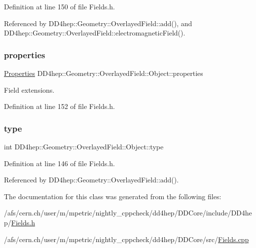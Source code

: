 Definition at line 150 of file Fields.\+h.



Referenced by D\+D4hep\+::\+Geometry\+::\+Overlayed\+Field\+::add(), and D\+D4hep\+::\+Geometry\+::\+Overlayed\+Field\+::electromagnetic\+Field().

\hypertarget{class_d_d4hep_1_1_geometry_1_1_overlayed_field_1_1_object_a184fdde08ca58abba25c3fbe812e21bc}{}\label{class_d_d4hep_1_1_geometry_1_1_overlayed_field_1_1_object_a184fdde08ca58abba25c3fbe812e21bc} 
\subsubsection{\texorpdfstring{properties}{properties}}
{\footnotesize\ttfamily \hyperlink{class_d_d4hep_1_1_geometry_1_1_overlayed_field_acdf81fbf8e0c336cb724ee2846a2c5b0}{Properties} D\+D4hep\+::\+Geometry\+::\+Overlayed\+Field\+::\+Object\+::properties}



Field extensions. 



Definition at line 152 of file Fields.\+h.

\hypertarget{class_d_d4hep_1_1_geometry_1_1_overlayed_field_1_1_object_a9cf611593f516274f139d0524d8480de}{}\label{class_d_d4hep_1_1_geometry_1_1_overlayed_field_1_1_object_a9cf611593f516274f139d0524d8480de} 
\subsubsection{\texorpdfstring{type}{type}}
{\footnotesize\ttfamily int D\+D4hep\+::\+Geometry\+::\+Overlayed\+Field\+::\+Object\+::type}



Definition at line 146 of file Fields.\+h.



Referenced by D\+D4hep\+::\+Geometry\+::\+Overlayed\+Field\+::add().



The documentation for this class was generated from the following files\+:\begin{DoxyCompactItemize}
\item 
/afs/cern.\+ch/user/m/mpetric/nightly\+\_\+cppcheck/dd4hep/\+D\+D\+Core/include/\+D\+D4hep/\hyperlink{_fields_8h}{Fields.\+h}\item 
/afs/cern.\+ch/user/m/mpetric/nightly\+\_\+cppcheck/dd4hep/\+D\+D\+Core/src/\hyperlink{_fields_8cpp}{Fields.\+cpp}\end{DoxyCompactItemize}
